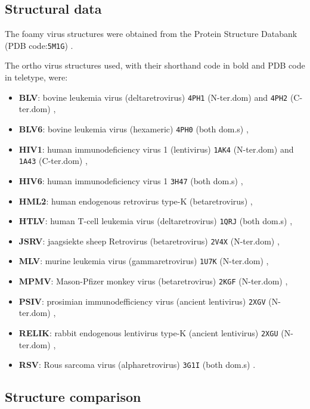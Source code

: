 \documentclass[preprint,12pt]{elsarticle}
\begin{document}
\subsection{Structural data}

The foamy virus structures were obtained from the Protein Structure Databank
(PDB code:{\tt 5M1G}) \cite{BallNJet16}.

The ortho virus structures used, with their shorthand code in bold and PDB code in teletype, were:
\begin{itemize}
\item {\bf BLV}:  bovine leukemia virus (deltaretrovirus) {\tt 4PH1} (N-ter.dom) and {\tt 4PH2} (C-ter.dom) \cite{ObalGet15},
\item {\bf BLV6}: bovine leukemia virus (hexameric) {\tt 4PH0} (both dom.s) \cite{ObalGet15},
\item {\bf HIV1}: human immunodeficiency virus 1 (lentivirus) {\tt 1AK4} (N-ter.dom) \cite{GambleTRet96} and {\tt 1A43} (C-ter.dom) \cite{WorthylakeDKet99},
\item {\bf HIV6}: human immunodeficiency virus 1 {\tt 3H47} (both dom.s) \cite{PornillosOet09},
\item {\bf HML2}: human endogenous retrovirus type-K (betaretrovirus) {\tt } \cite{MortuzaGBet08},
\item {\bf HTLV}: human T-cell leukemia virus (deltaretrovirus) {\tt 1QRJ} (both dom.s) \cite{KhorasanizadehSet99},
\item {\bf JSRV}: jaagsiekte sheep Retrovirus (betaretrovirus) {\tt 2V4X} (N-ter.dom) \cite{MortuzaGBet09},
\item {\bf MLV}:  murine leukemia virus (gammaretrovirus) {\tt 1U7K} (N-ter.dom) \cite{MortuzaGBet04},
\item {\bf MPMV}: Mason-Pfizer monkey virus (betaretrovirus) {\tt 2KGF} (N-ter.dom) \cite{MacekPet09},
\item {\bf PSIV}: prosimian immunodefficiency virus (ancient lentivirus) {\tt 2XGV} (N-ter.dom) \cite{GoldstoneDCet10},
\item {\bf RELIK}: rabbit endogenous lentivirus type-K (ancient lentivirus) {\tt 2XGU} (N-ter.dom) \cite{GoldstoneDCet10},
\item {\bf RSV}:  Rous sarcoma virus (alpharetrovirus) {\tt 3G1I} (both dom.s) \cite{BaileyGDet09}.
\end{itemize}

\subsection{Structure comparison}
\end{document}
